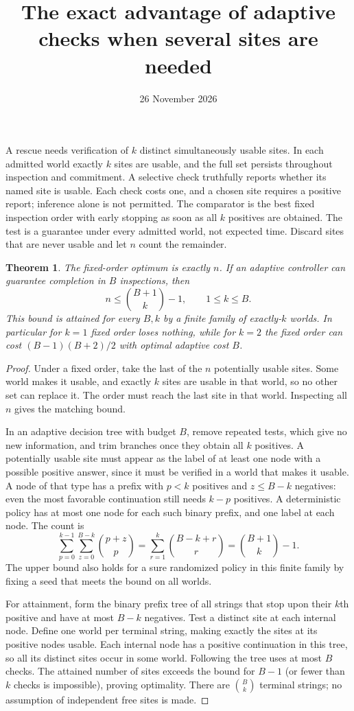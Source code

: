\documentclass[11pt]{article}
\title{The exact advantage of adaptive checks when several sites are needed}
\author{}
\date{26 November 2026}
\newtheorem{theorem}{Theorem}
\begin{document}
\maketitle

A rescue needs verification of $k$ distinct simultaneously usable sites. In each admitted world exactly $k$ sites are usable, and the full set persists throughout inspection and commitment. A selective check truthfully reports whether its named site is usable. Each check costs one, and a chosen site requires a positive report; inference alone is not permitted. The comparator is the best fixed inspection order with early stopping as soon as all $k$ positives are obtained. The test is a guarantee under every admitted world, not expected time. Discard sites that are never usable and let $n$ count the remainder.

\begin{theorem}
The fixed-order optimum is exactly $n$. If an adaptive controller can guarantee completion in $B$ inspections, then
\[
 n\le \binom{B+1}{k}-1,\qquad 1\le k\le B.
\]
This bound is attained for every $B,k$ by a finite family of exactly-$k$ worlds. In particular for $k=1$ fixed order loses nothing, while for $k=2$ the fixed order can cost $(B-1)(B+2)/2$ with optimal adaptive cost $B$.
\end{theorem}

\begin{proof}
Under a fixed order, take the last of the $n$ potentially usable sites. Some world makes it usable, and exactly $k$ sites are usable in that world, so no other set can replace it. The order must reach the last site in that world. Inspecting all $n$ gives the matching bound.

In an adaptive decision tree with budget $B$, remove repeated tests, which give no new information, and trim branches once they obtain all $k$ positives. A potentially usable site must appear as the label of at least one node with a possible positive answer, since it must be verified in a world that makes it usable. A node of that type has a prefix with $p<k$ positives and $z\le B-k$ negatives: even the most favorable continuation still needs $k-p$ positives. A deterministic policy has at most one node for each such binary prefix, and one label at each node. The count is
\[
 \sum_{p=0}^{k-1}\sum_{z=0}^{B-k}\binom{p+z}{p}
 =\sum_{r=1}^{k}\binom{B-k+r}{r}
 =\binom{B+1}{k}-1 .
\]
The upper bound also holds for a sure randomized policy in this finite family by fixing a seed that meets the bound on all worlds.

For attainment, form the binary prefix tree of all strings that stop upon their $k$th positive and have at most $B-k$ negatives. Test a distinct site at each internal node. Define one world per terminal string, making exactly the sites at its positive nodes usable. Each internal node has a positive continuation in this tree, so all its distinct sites occur in some world. Following the tree uses at most $B$ checks. The attained number of sites exceeds the bound for $B-1$ (or fewer than $k$ checks is impossible), proving optimality. There are $\binom{B}{k}$ terminal strings; no assumption of independent free sites is made.
\end{proof}
\end{document}
